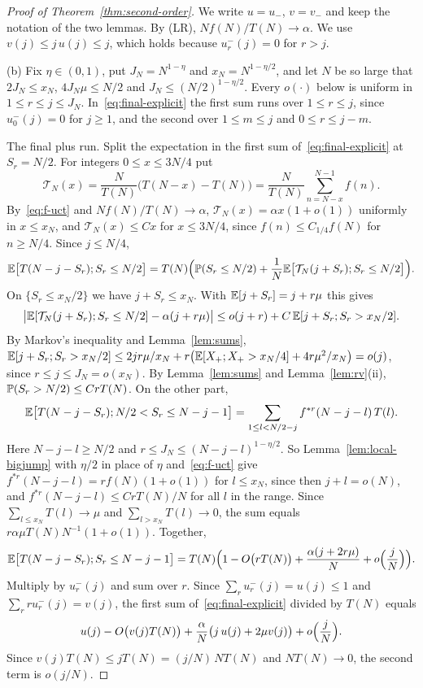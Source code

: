 \begin{proof}[Proof of Theorem~\ref{thm:second-order}]
We write $u=u_\minus$, $v=v_\minus$ and keep the notation of the two lemmas. By (LR),
$Nf(N)/T(N)\to\alpha$. We use $v(j)\le j\,u(j)\le j$, which holds because
$u^\minus_r(j)=0$ for $r>j$.

(b) Fix $\eta\in(0,1)$, put $J_N=N^{1-\eta}$ and $x_N=N^{1-\eta/2}$, and let $N$ be so
large that $2J_N\le x_N$, $4J_N\mu\le N/2$ and $J_N\le(N/2)^{1-\eta/2}$. Every $o(\cdot)$
below is uniform in $1\le r\le j\le J_N$. In~\eqref{eq:final-explicit} the first sum runs
over $1\le r\le j$, since $u^\minus_0(j)=0$ for $j\ge1$, and the second over $1\le m\le j$
and $0\le r\le j-m$.

The final plus run. Split the expectation in the first sum
of~\eqref{eq:final-explicit} at $S_r=N/2$. For integers $0\le x\le3N/4$ put
\[
 \mathcal T_N(x)=\frac{N}{T(N)}\bigl(T(N-x)-T(N)\bigr)=\frac{N}{T(N)}\sum_{n=N-x}^{N-1}f(n).
\]
By~\eqref{eq:f-uct} and $Nf(N)/T(N)\to\alpha$, $\mathcal T_N(x)=\alpha x(1+o(1))$ uniformly in
$x\le x_N$, and $\mathcal T_N(x)\le Cx$ for $x\le3N/4$, since $f(n)\le C_{1/4}f(N)$ for
$n\ge N/4$. Since $j\le N/4$,
\[
 \mathbb{E}\bigl[T(N-j-S_r);S_r\le N/2\bigr]=T(N)\Bigl(\mathbb{P}(S_r\le N/2)+\frac1N\mathbb{E}\bigl[\mathcal T_N(j+S_r);S_r\le N/2\bigr]\Bigr).
\]
On $\{S_r\le x_N/2\}$ we have $j+S_r\le x_N$. With $\mathbb{E}[j+S_r]=j+r\mu$ this gives
\[
 \bigl|\mathbb{E}[\mathcal T_N(j+S_r);S_r\le N/2]-\alpha(j+r\mu)\bigr|
 \le o(j+r)+C\,\mathbb{E}[j+S_r;S_r>x_N/2].
\]
By Markov's inequality and Lemma~\ref{lem:sums},
$\mathbb{E}[j+S_r;S_r>x_N/2]\le2jr\mu/x_N+r\bigl(\mathbb{E}[X_{+};X_{+}>x_N/4]+4r\mu^2/x_N\bigr)=o(j)$,
since $r\le j\le J_N=o(x_N)$. By Lemma~\ref{lem:sums} and Lemma~\ref{lem:rv}(ii),
$\mathbb{P}(S_r>N/2)\le CrT(N)$. On the other part,
\[
 \mathbb{E}\bigl[T(N-j-S_r);N/2<S_r\le N-j-1\bigr]=\sum_{1\le l<N/2-j}f^{*r}(N-j-l)\,T(l).
\]
Here $N-j-l\ge N/2$ and $r\le J_N\le(N-j-l)^{1-\eta/2}$. So Lemma~\ref{lem:local-bigjump}
with $\eta/2$ in place of $\eta$ and~\eqref{eq:f-uct} give $f^{*r}(N-j-l)=rf(N)(1+o(1))$
for $l\le x_N$, since then $j+l=o(N)$, and $f^{*r}(N-j-l)\le CrT(N)/N$ for all $l$ in the
range. Since $\sum_{l\le x_N}T(l)\to\mu$ and $\sum_{l>x_N}T(l)\to0$, the sum equals
$r\alpha\mu T(N)N^{-1}(1+o(1))$. Together,
\[
 \mathbb{E}\bigl[T(N-j-S_r);S_r\le N-j-1\bigr]=T(N)\Bigl(1-O\bigl(rT(N)\bigr)+\frac{\alpha(j+2r\mu)}{N}+o\Bigl(\frac jN\Bigr)\Bigr).
\]
Multiply by $u^\minus_r(j)$ and sum over $r$. Since $\sum_ru^\minus_r(j)=u(j)\le1$ and
$\sum_rru^\minus_r(j)=v(j)$, the first sum of~\eqref{eq:final-explicit} divided by $T(N)$
equals
\[
 u(j)-O\bigl(v(j)T(N)\bigr)+\frac{\alpha}{N}\bigl(j\,u(j)+2\mu v(j)\bigr)+o\Bigl(\frac{j}{N}\Bigr).
\]
Since $v(j)T(N)\le jT(N)=(j/N)\,NT(N)$ and $NT(N)\to0$, the second term is $o(j/N)$.


\end{proof}
